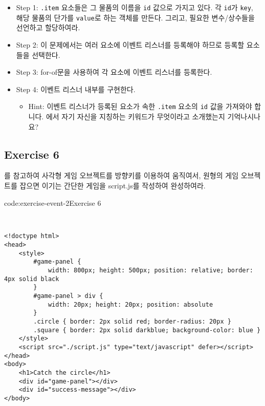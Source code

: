 \begin{itemize}
    \item Step 1: \texttt{.item} 요소들은 그 물품의 이름을 \texttt{id} 값으로 가지고 있다. 각 \texttt{id}가 \texttt{key}, 해당 물품의 단가를 \texttt{value}로 하는 객체를 만든다. 그리고, 필요한 변수/상수들을 선언하고 할당하여라.
    \item Step 2: 이 문제에서는 여러 요소에 이벤트 리스너를 등록해야 하므로 등록할 요소들을 선택한다.
    \item Step 3: for-of문을 사용하여 각 요소에 이벤트 리스너를 등록한다.
    \item Step 4: 이벤트 리스너 내부를 구현한다.
    \begin{itemize}
        \item Hint: 이벤트 리스너가 등록된 요소가 속한 \texttt{.item} 요소의 \texttt{id} 값을 가져와야 합니다. 에서 자기 자신을 지칭하는 키워드가 무엇이라고 소개했는지 기억나시나요?
    \end{itemize}
\end{itemize}

\subsection*{Exercise 6}

를 참고하여 사각형 게임 오브젝트를 방향키를 이용하여 움직여서, 원형의 게임 오브젝트를 잡으면 이기는 간단한 게임을 script.js를 작성하여 완성하여라.

\begin{codeenv}{code:exercise-event-2}{Exercise 6}\begin{verbatim}


<!doctype html>
<head>
    <style>
        #game-panel {
            width: 800px; height: 500px; position: relative; border: 4px solid black
        }
        #game-panel > div {
            width: 20px; height: 20px; position: absolute
        }
        .circle { border: 2px solid red; border-radius: 20px }
        .square { border: 2px solid darkblue; background-color: blue }
    </style>
    <script src="./script.js" type="text/javascript" defer></script>
</head>
<body>
    <h1>Catch the circle</h1>
    <div id="game-panel"></div>
    <div id="success-message"></div>
</body>
\end{verbatim}
\end{codeenv}

